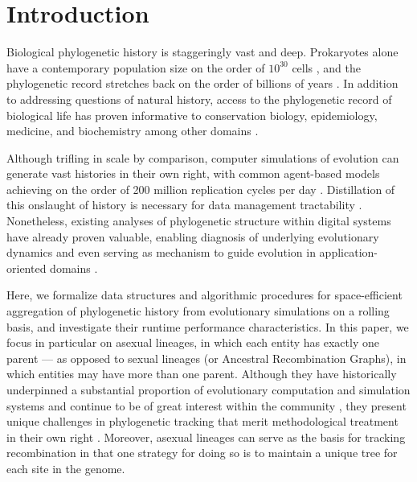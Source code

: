 \section{Introduction} \label{sec:introduction}

Biological phylogenetic history is staggeringly vast and deep.
Prokaryotes alone have a contemporary population size on the order of $10^{30}$ cells \citep{whitman1998prokaryotes}, and the phylogenetic record stretches back on the order of billions of years \citep{arndt2012processes}.
In addition to addressing questions of natural history, access to the phylogenetic record of biological life has proven informative to conservation biology, epidemiology, medicine, and biochemistry among other domains \citep{faith1992conservation, stamatakis2005phylogenetics, french2023host,kim2006discovery}.

Although trifling in scale by comparison, computer simulations of evolution can generate vast histories in their own right, with common agent-based models achieving on the order of 200 million replication cycles per day \citep{ofria2009artificial}.
Distillation of this onslaught of history is necessary for data management tractability \citep{dolson2020interpreting, ralph2020efficiently}.
Nonetheless, existing analyses of phylogenetic structure within digital systems have already proven valuable, enabling diagnosis of underlying evolutionary dynamics \citep{moreno2025ecology,hernandez2022can,shahbandegan2022untangling, lewinsohn2023state} and even serving as mechanism to guide evolution in application-oriented domains \citep{lalejini2024phylogeny,lalejini2024runtime,murphy2008simple,burke2003increased}.

Here, we formalize data structures and algorithmic procedures for space-efficient aggregation of phylogenetic history from evolutionary simulations on a rolling basis, and investigate their runtime performance characteristics.
In this paper, we focus in particular on asexual lineages, in which each entity has exactly one parent --- as opposed to sexual lineages (or Ancestral Recombination Graphs), in which entities may have more than one parent.
Although they have historically underpinned a substantial proportion of evolutionary computation and simulation systems \citep{koza1994genetic,jefferson1990evolution} and continue to be of great interest within the community \citep{dang2018escaping}, they present unique challenges in phylogenetic tracking that merit methodological treatment in their own right \citep{godin2019apoget,moreno2024methods,mcphee2018detailed}. Moreover, asexual lineages can serve as the basis for tracking recombination in that one strategy for doing so is to maintain a unique tree for each site in the genome.


